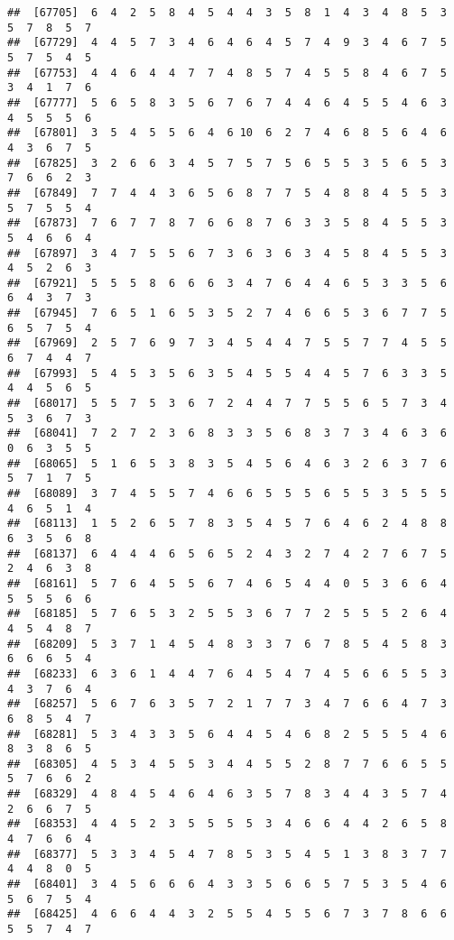 \documentclass[
]{book}
\begin{document}
\begin{verbatim}
##  [67705]  6  4  2  5  8  4  5  4  4  3  5  8  1  4  3  4  8  5  3  5  7  8  5  7
##  [67729]  4  4  5  7  3  4  6  4  6  4  5  7  4  9  3  4  6  7  5  5  7  5  4  5
##  [67753]  4  4  6  4  4  7  7  4  8  5  7  4  5  5  8  4  6  7  5  3  4  1  7  6
##  [67777]  5  6  5  8  3  5  6  7  6  7  4  4  6  4  5  5  4  6  3  4  5  5  5  6
##  [67801]  3  5  4  5  5  6  4  6 10  6  2  7  4  6  8  5  6  4  6  4  3  6  7  5
##  [67825]  3  2  6  6  3  4  5  7  5  7  5  6  5  5  3  5  6  5  3  7  6  6  2  3
##  [67849]  7  7  4  4  3  6  5  6  8  7  7  5  4  8  8  4  5  5  3  5  7  5  5  4
##  [67873]  7  6  7  7  8  7  6  6  8  7  6  3  3  5  8  4  5  5  3  5  4  6  6  4
##  [67897]  3  4  7  5  5  6  7  3  6  3  6  3  4  5  8  4  5  5  3  4  5  2  6  3
##  [67921]  5  5  5  8  6  6  6  3  4  7  6  4  4  6  5  3  3  5  6  6  4  3  7  3
##  [67945]  7  6  5  1  6  5  3  5  2  7  4  6  6  5  3  6  7  7  5  6  5  7  5  4
##  [67969]  2  5  7  6  9  7  3  4  5  4  4  7  5  5  7  7  4  5  5  6  7  4  4  7
##  [67993]  5  4  5  3  5  6  3  5  4  5  5  4  4  5  7  6  3  3  5  4  4  5  6  5
##  [68017]  5  5  7  5  3  6  7  2  4  4  7  7  5  5  6  5  7  3  4  5  3  6  7  3
##  [68041]  7  2  7  2  3  6  8  3  3  5  6  8  3  7  3  4  6  3  6  0  6  3  5  5
##  [68065]  5  1  6  5  3  8  3  5  4  5  6  4  6  3  2  6  3  7  6  5  7  1  7  5
##  [68089]  3  7  4  5  5  7  4  6  6  5  5  5  6  5  5  3  5  5  5  4  6  5  1  4
##  [68113]  1  5  2  6  5  7  8  3  5  4  5  7  6  4  6  2  4  8  8  6  3  5  6  8
##  [68137]  6  4  4  4  6  5  6  5  2  4  3  2  7  4  2  7  6  7  5  2  4  6  3  8
##  [68161]  5  7  6  4  5  5  6  7  4  6  5  4  4  0  5  3  6  6  4  5  5  5  6  6
##  [68185]  5  7  6  5  3  2  5  5  3  6  7  7  2  5  5  5  2  6  4  4  5  4  8  7
##  [68209]  5  3  7  1  4  5  4  8  3  3  7  6  7  8  5  4  5  8  3  6  6  6  5  4
##  [68233]  6  3  6  1  4  4  7  6  4  5  4  7  4  5  6  6  5  5  3  4  3  7  6  4
##  [68257]  5  6  7  6  3  5  7  2  1  7  7  3  4  7  6  6  4  7  3  6  8  5  4  7
##  [68281]  5  3  4  3  3  5  6  4  4  5  4  6  8  2  5  5  5  4  6  8  3  8  6  5
##  [68305]  4  5  3  4  5  5  3  4  4  5  5  2  8  7  7  6  6  5  5  5  7  6  6  2
##  [68329]  4  8  4  5  4  6  4  6  3  5  7  8  3  4  4  3  5  7  4  2  6  6  7  5
##  [68353]  4  4  5  2  3  5  5  5  5  3  4  6  6  4  4  2  6  5  8  4  7  6  6  4
##  [68377]  5  3  3  4  5  4  7  8  5  3  5  4  5  1  3  8  3  7  7  4  4  8  0  5
##  [68401]  3  4  5  6  6  6  4  3  3  5  6  6  5  7  5  3  5  4  6  5  6  7  5  4
##  [68425]  4  6  6  4  4  3  2  5  5  4  5  5  6  7  3  7  8  6  6  5  5  7  4  7

\end{verbatim}
\end{document}
